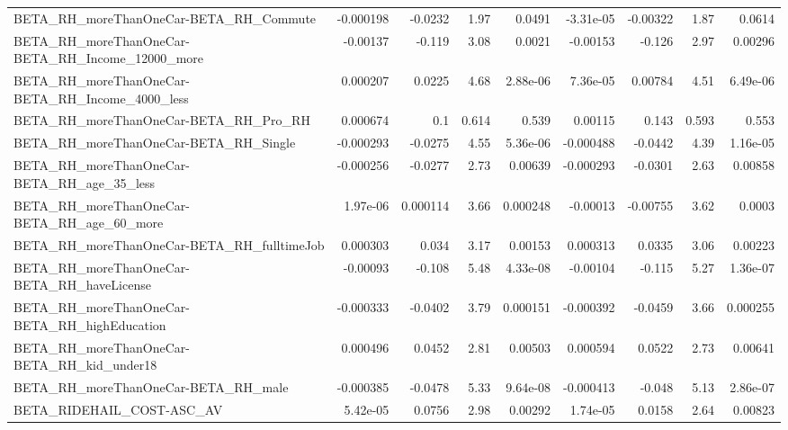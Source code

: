 \begin{tabular}{lrrrrrrrr}
BETA\_RH\_moreThanOneCar-BETA\_RH\_Commute             &   -0.000198 &      -0.0232 &      1.97 &   0.0491 &  -3.31e-05 &    -0.00322 &         1.87 &        0.0614 \\
BETA\_RH\_moreThanOneCar-BETA\_RH\_Income\_12000\_more   &    -0.00137 &       -0.119 &      3.08 &   0.0021 &   -0.00153 &      -0.126 &         2.97 &       0.00296 \\
BETA\_RH\_moreThanOneCar-BETA\_RH\_Income\_4000\_less    &    0.000207 &       0.0225 &      4.68 & 2.88e-06 &   7.36e-05 &     0.00784 &         4.51 &      6.49e-06 \\
BETA\_RH\_moreThanOneCar-BETA\_RH\_Pro\_RH              &    0.000674 &          0.1 &     0.614 &    0.539 &    0.00115 &       0.143 &        0.593 &         0.553 \\
BETA\_RH\_moreThanOneCar-BETA\_RH\_Single              &   -0.000293 &      -0.0275 &      4.55 & 5.36e-06 &  -0.000488 &     -0.0442 &         4.39 &      1.16e-05 \\
BETA\_RH\_moreThanOneCar-BETA\_RH\_age\_35\_less         &   -0.000256 &      -0.0277 &      2.73 &  0.00639 &  -0.000293 &     -0.0301 &         2.63 &       0.00858 \\
BETA\_RH\_moreThanOneCar-BETA\_RH\_age\_60\_more         &    1.97e-06 &     0.000114 &      3.66 & 0.000248 &   -0.00013 &    -0.00755 &         3.62 &        0.0003 \\
BETA\_RH\_moreThanOneCar-BETA\_RH\_fulltimeJob         &    0.000303 &        0.034 &      3.17 &  0.00153 &   0.000313 &      0.0335 &         3.06 &       0.00223 \\
BETA\_RH\_moreThanOneCar-BETA\_RH\_haveLicense         &    -0.00093 &       -0.108 &      5.48 & 4.33e-08 &   -0.00104 &      -0.115 &         5.27 &      1.36e-07 \\
BETA\_RH\_moreThanOneCar-BETA\_RH\_highEducation       &   -0.000333 &      -0.0402 &      3.79 & 0.000151 &  -0.000392 &     -0.0459 &         3.66 &      0.000255 \\
BETA\_RH\_moreThanOneCar-BETA\_RH\_kid\_under18         &    0.000496 &       0.0452 &      2.81 &  0.00503 &   0.000594 &      0.0522 &         2.73 &       0.00641 \\
BETA\_RH\_moreThanOneCar-BETA\_RH\_male                &   -0.000385 &      -0.0478 &      5.33 & 9.64e-08 &  -0.000413 &      -0.048 &         5.13 &      2.86e-07 \\
BETA\_RIDEHAIL\_COST-ASC\_AV                          &    5.42e-05 &       0.0756 &      2.98 &  0.00292 &   1.74e-05 &      0.0158 &         2.64 &       0.00823 \\

\end{tabular}
